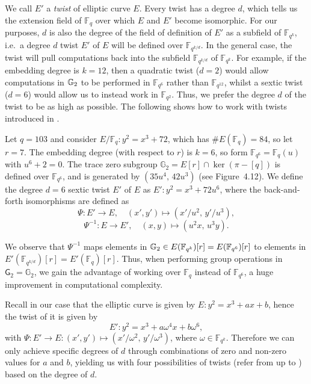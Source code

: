 We call $E'$ a \emph{twist}  of elliptic curve $E$. Every twist has a degree $d$, which tells
us the extension field of $\mathbb{F}_q$ over which $E$ and $E'$ become isomorphic. For our purposes, $d$ is also the degree of the field of definition of $E'$ as a subfield of $\mathbb{F}_{q^k}$, i.e.\ a degree $d$ twist $E'$ of $E$ will be defined over $\mathbb{F}_{q^{k/d}}$.
In the general case, the twist will pull computations back into the subfield
$\mathbb{F}_{q^{k/d}}$ of $\mathbb{F}_{q^k}$. For example, if the embedding
degree is $k = 12$, then a quadratic twist ($d = 2$) would allow computations in
$\mathbb{G}_2$ to be performed in $\mathbb{F}_{q^6}$ rather than $\mathbb{F}_{q^{12}}$,
whilst a sextic twist ($d = 6$) would allow us to instead work in
$\mathbb{F}_{q^2}$. Thus, we prefer the degree $d$ of the twist to be as high as possible.  The following  shows how to work with twists introduced in .

\begin{example}
	Let $q = 103$ and consider $E/\mathbb{F}_q : y^2 = x^3 + 72$, which has
	$\#E(\mathbb{F}_q) = 84$, so let $r = 7$. The embedding degree (with respect
	to $r$) is $k = 6$, so form $\mathbb{F}_{q^6} = \mathbb{F}_q(u)$ with
	$u^6 + 2 = 0$. The trace zero subgroup $\mathbb{G}_2 = E[r] \cap \ker(\pi -
	[q])$ is defined over $\mathbb{F}_{q^6}$, and is generated by
	$(35u^4,\, 42u^3)$ (see Figure~4.12). We define the degree $d = 6$ sextic
	twist $E'$ of $E$ as $E' : y^2 = x^3 + 72u^6$,  where the back-and-forth isomorphisms are defined as
	\[
	\Psi : E' \to E, \quad (x', y') \mapsto (x'/u^2,\, y'/u^3), 
	\]
	\[
	\Psi^{-1} : E \to E', \quad (x, y) \mapsto (u^2 x,\, u^3 y).
	\]
	
	We observe that $\Psi^{-1}$ maps elements in
	$\mathbb{G}_2 \in E(\mathbb{F}_{q^k})[r] = E(\mathbb{F}_{q^6})[r]$ to elements
	in $E'(\mathbb{F}_{q^{k/d}})[r] = E'(\mathbb{F}_q)[r]$. Thus, when performing
	group operations in $\mathsf{G}_2 = \mathbb{G}_2$, we gain the advantage of working over
	$\mathbb{F}_q$ instead of $\mathbb{F}_{q^6}$, a huge improvement in computational complexity.
	\label{example:workingwithtwists}
\end{example}


Recall in our case that the elliptic curve is given by $E : y^2 = x^3 + ax + b$, hence  the twist of it is given by
\[
E' : y^2 = x^3 + a\omega^4 x + b\omega^6,
\]
with $\Psi : E' \to E : (x', y') \mapsto (x'/\omega^2,\, y'/\omega^3)$, where
$\omega \in \mathbb{F}_{q^k}$. Therefore we can only achieve specific degrees of $d$ through
combinations of zero and non-zero values for $a$ and $b$, yielding us with four possibilities of twists (refer from  up to )  based on the degree of $d$. 

